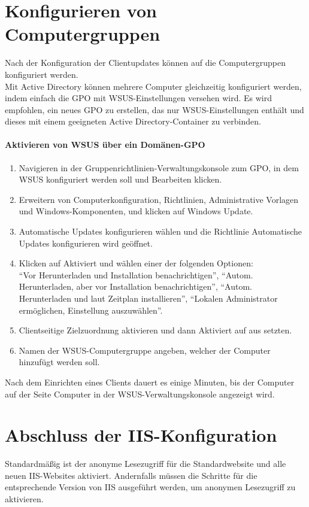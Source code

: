 \documentclass{preset/school}
\begin{document}
\section{Konfigurieren von Computergruppen}
Nach der Konfiguration der Clientupdates können auf die Computergruppen konfiguriert werden.
\\\vspace{0.5 em}
Mit Active Directory können mehrere Computer gleichzeitig konfiguriert werden, indem einfach die GPO mit WSUS-Einstellungen versehen wird.
Es wird empfohlen, ein neues GPO zu erstellen, das nur WSUS-Einstellungen enthält und dieses mit einem geeigneten Active Directory-Container zu verbinden.

\paragraph{Aktivieren von WSUS über ein Domänen-GPO}
\begin{enumerate}
    \item Navigieren in der Gruppenrichtlinien-Verwaltungskonsole zum GPO, in dem WSUS konfiguriert werden soll und Bearbeiten klicken.
    \item Erweitern von Computerkonfiguration, Richtlinien, Administrative Vorlagen und Windows-Komponenten, und klicken auf Windows Update.
    \item Automatische Updates konfigurieren wählen und die Richtlinie Automatische Updates konfigurieren wird geöffnet.
    \item Klicken auf Aktiviert und wählen einer der folgenden Optionen:\\
    ``Vor Herunterladen und Installation benachrichtigen'', ``Autom. Herunterladen, aber vor Installation benachrichtigen'', ``Autom. Herunterladen und laut Zeitplan installieren'', ``Lokalen Administrator ermöglichen, Einstellung auszuwählen''.
    \item Clientseitige Zielzuordnung aktivieren und dann Aktiviert auf aus setzten.
    \item Namen der WSUS-Computergruppe angeben, welcher der Computer hinzufügt werden soll.
\end{enumerate}
Nach dem Einrichten eines Clients dauert es einige Minuten, bis der Computer auf der Seite Computer in der WSUS-Verwaltungskonsole angezeigt wird.

\section{Abschluss der IIS-Konfiguration}
Standardmäßig ist der anonyme Lesezugriff für die Standardwebsite und alle neuen IIS-Websites aktiviert.
Andernfalls müssen die Schritte für die entsprechende Version von IIS ausgeführt werden, um anonymen Lesezugriff zu aktivieren.
\end{document}
